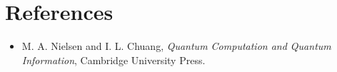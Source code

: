 \documentclass[a4paper]{article}
\begin{document}
\section{References}

\begin{itemize}
    \item M. A. Nielsen and I. L. Chuang, \textit{Quantum Computation and Quantum Information}, Cambridge University Press.
\end{itemize}
\end{document}
